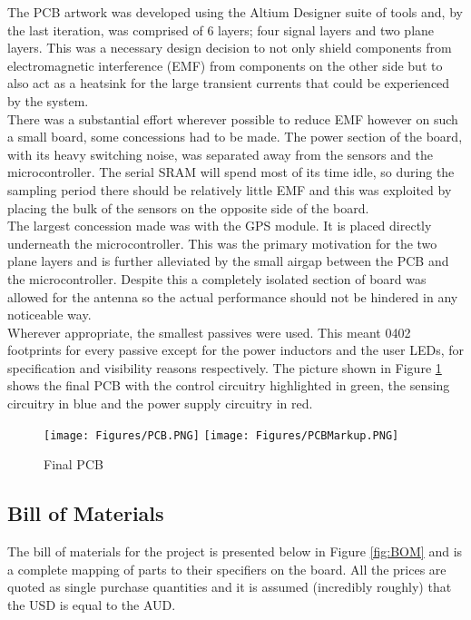 \documentclass[12pt,openany,a4paper]{book}
\begin{document}
			The PCB artwork was developed using the Altium Designer suite of tools and, by the last iteration, was comprised of 6 layers; four signal layers and two plane layers. This was a necessary design decision to not only shield components from electromagnetic interference (EMF) from components on the other side but to also act as a heatsink for the large transient currents that could be experienced by the system. \\
			
			There was a substantial effort wherever possible to reduce EMF however on such a small board, some concessions had to be made. The power section of the board, with its heavy switching noise, was separated away from the sensors and the microcontroller. The serial SRAM will spend most of its time idle, so during the sampling period there should be relatively little EMF and this was exploited by placing the bulk of the sensors on the opposite side of the board. \\
			
			The largest concession made was with the GPS module. It is placed directly underneath the microcontroller. This was the primary motivation for the two plane layers and is further alleviated by the small airgap between the PCB and the microcontroller. Despite this a completely isolated section of board was allowed for the antenna so the actual performance should not be hindered in any noticeable way. \\
			
			Wherever appropriate, the smallest passives were used. This meant 0402 footprints for every passive except for the power inductors and the user LEDs, for specification and visibility reasons respectively. The picture shown in Figure \ref{fig:PCB} shows the final PCB with the control circuitry highlighted in green, the sensing circuitry in blue and the power supply circuitry in red. \\

		\begin{figure}[H]
			\centering
			\texttt{[image: Figures/PCB.PNG]}
			\texttt{[image: Figures/PCBMarkup.PNG]}
			\caption{Final PCB}
			\label{fig:PCB}
		\end{figure}		
			
		\subsection{Bill of Materials}
		The bill of materials for the project is presented below in Figure \ref{fig:BOM} and is a complete mapping of parts to their specifiers on the board. All the prices are quoted as single purchase quantities and it is assumed (incredibly roughly) that the USD is equal to the AUD. \\
		
\end{document}

